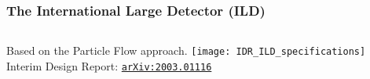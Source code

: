 \begin{frame}
    \frametitle{The International Large Detector (ILD)}
    \begin{columns}[c,onlytextwidth]
    \begin{column}{0.5\textwidth}
    Based on the Particle Flow approach.
    \texttt{[image: IDR\_ILD\_specifications]}
    \vfill
    {\footnotesize
    Interim Design Report:
    \href{https://arxiv.org/abs/2003.01116}{\color{llblue} \texttt{arXiv:2003.01116}}
    }
    \end{column}
    \begin{column}{0.5\textwidth}
    \end{column}
    \end{columns}
    \end{frame}
